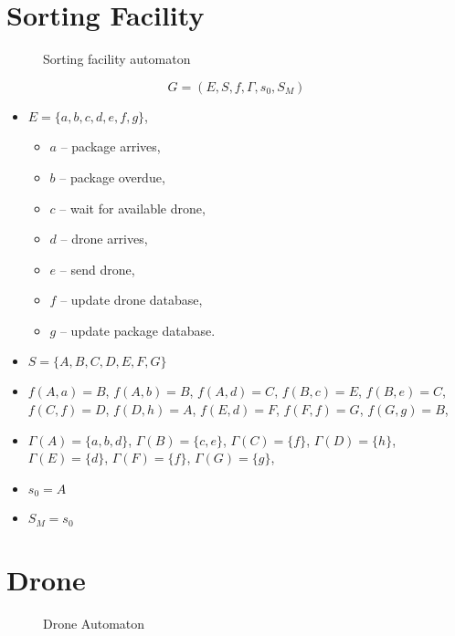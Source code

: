 


\pdfpageheight   297mm
\pdfpagewidth    210mm

\section{Sorting Facility}

\begin{figure}[htbp]
  \centering
  
  \caption{Sorting facility automaton}
\end{figure}

\begin{equation*}
    G = (E,S,f,\Gamma, s_0, S_M)
\end{equation*}

\begin{itemize}
    \item $E = \{a,b,c, d, e, f, g\}$,
    \begin{itemize}
        \item $a$ -- package arrives,
        \item $b$ -- package overdue,
        \item $c$ -- wait for available drone,
        \item $d$ -- drone arrives,
        \item $e$ -- send drone,
        \item $f$ -- update drone database,
        \item $g$ -- update package database.
    \end{itemize}
    \item $S = \{A, B,C,D,E,F,G\}$
    \item $f(A,a) = B$, $f(A,b) = B$, $f(A,d) = C$, $f(B,c) = E$, $f(B,e) = C$, $f(C,f) = D$, $f(D,h) = A$, $f(E,d) = F$, $f(F,f) = G$, $f(G,g) = B$,
    \item $\Gamma(A) = \{a,b,d\}$, $\Gamma(B) = \{c,e\}$, $\Gamma(C) = \{f\}$, $\Gamma(D) = \{h\}$, $\Gamma(E) = \{d\}$, $\Gamma(F) = \{f\}$, $\Gamma(G) = \{g\}$,
    \item $s_0 = A$
    \item $S_M = s_0$
\end{itemize}

\newpage

\section{Drone}

\begin{figure}[htbp]
  \centering
  
  \caption{Drone Automaton}
\end{figure}

